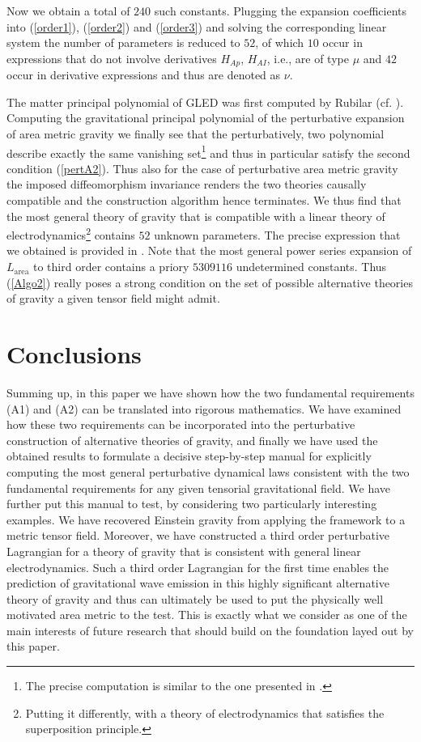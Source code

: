 \documentclass[%
 reprint,
nofootinbib,
 amsmath,amssymb,
 aps,
 prd,
floatfix,
]{revtex4-2}
\begin{document}
Now we obtain a total of $240$ such constants. Plugging the expansion coefficients into (\ref{order1}), (\ref{order2}) and (\ref{order3}) and solving the corresponding linear system the number of parameters is reduced to $52$, of which $10$ occur in expressions that do not involve derivatives $H_{Ap}$, $H_{AI}$, i.e., are of type $\mu$ and $42$ occur in derivative expressions and thus are denoted as $\nu$.

The matter principal polynomial of GLED was first computed by Rubilar (cf. \cite{2009JPhA...42U5402I}).
Computing the gravitational principal polynomial of the perturbative expansion of area metric gravity we finally see that the perturbatively, two polynomial describe exactly the same vanishing set\footnote{The precise computation is similar to the one presented in \cite{TobiR}.} and thus in particular satisfy the second condition (\ref{pertA2}). 
Thus also for the case of perturbative area metric gravity the imposed diffeomorphism invariance renders the two theories causally compatible and the construction algorithm hence terminates. 
We thus find that the most general theory of gravity that is compatible with a linear theory of electrodynamics\footnote{Putting it differently, with a theory of electrodynamics that satisfies the superposition principle.} contains $52$ unknown parameters. The precise expression that we obtained is provided in \cite{TobiMaster}.
Note that the most general power series expansion of $L_{\text{area}}$ to third order contains a priory $5309116$ undetermined constants. Thus (\ref{Algo2}) really poses a strong condition on the set of possible alternative theories of gravity a given tensor field might admit. 
\section{Conclusions}
Summing up, in this paper we have shown how the two fundamental requirements (A1) and (A2) can be translated into rigorous mathematics. We have examined how these two requirements can be incorporated into the perturbative construction of alternative theories of gravity, and finally we have used the obtained results to formulate a decisive step-by-step manual for explicitly computing the most general perturbative dynamical laws consistent with the two fundamental requirements for any given tensorial gravitational field.  
We have further put this manual to test, by considering two particularly interesting examples. We have recovered Einstein gravity from applying the framework to a metric tensor field. Moreover, we have constructed a third order perturbative Lagrangian for a theory of gravity that is consistent with general linear electrodynamics. Such a third order Lagrangian for the first time enables the prediction of gravitational wave emission in this highly significant alternative theory of gravity and thus can ultimately be used to put the physically well motivated area metric to the test. This is exactly what we consider as one of the main interests of future research that should build on the foundation layed out by this paper.  



\end{document}
